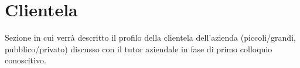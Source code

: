 \section{Clientela}

Sezione in cui verrà descritto il profilo della clientela dell'azienda (piccoli/grandi, pubblico/privato) discusso con il tutor aziendale in fase di primo colloquio conoscitivo.